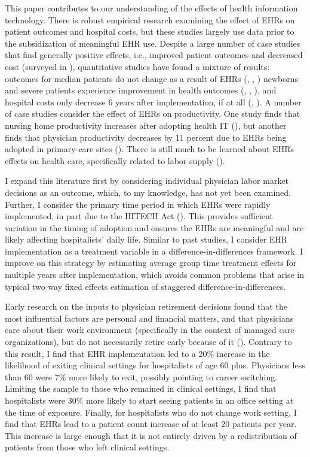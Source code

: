 \documentclass[12pt]{article}
\begin{document}
This paper contributes to our understanding of the effects of health information technology. There is robust empirical research examining the effect of EHRs on patient outcomes and hospital costs, but these studies largely use data prior to the subsidization of meaningful EHR use. Despite a large number of case studies that find generally positive effects, i.e., improved patient outcomes and decreased cost (surveyed in \cite{Buntin2011TheResults}), quantitative studies have found a mixture of results: outcomes for median patients do not change as a result of EHRs (\cite{Agha2014TheCare}, \cite{McCullough2016HealthCoordination}, \cite{Meyerhoefer}) newborns and severe patients experience improvement in health outcomes (\cite{Miller2009}, \cite{Freedman2015}, \cite{McCullough2016HealthCoordination}), and hospital costs only decrease 6 years after implementation, if at all (\cite{Agha2014TheCare}, \cite{dranove2014trillion}). A number of case studies consider the effect of EHRs on productivity. One study finds that nursing home productivity increases after adopting health IT (\cite{Hitt2016}), but another finds that physician productivity decreases by 11 percent due to EHRs being adopted in primary-care sites (\cite{Meyerhoefer}). There is still much to be learned about EHRs effects on health care, specifically related to labor supply (\cite{NBERw29218}). 

I expand this literature first by considering individual physician labor market decisions as an outcome, which, to my knowledge, has not yet been examined. Further, I consider the primary time period in which EHRs were rapidly implemented, in part due to the HITECH Act (\cite{dranove2015investment}). This provides sufficient variation in the timing of adoption and ensures the EHRs are meaningful and are likely affecting hospitalists' daily life. Similar to past studies, I consider EHR implementation as a treatment variable in a difference-in-differences framework. I improve on this strategy by estimating average group time treatment effects for multiple years after implementation, which avoids common problems that arise in typical two way fixed effects estimation of staggered difference-in-differences.  

Early research on the inputs to physician retirement decisions found that the most influential factors are personal and financial matters, and that physicians care about their work environment (specifically in the context of managed care organizations), but do not necessarily retire early because of it (\cite{Bahrami2002}). Contrary to this result, I find that EHR implementation led to a 20\% increase in the likelihood of exiting clinical settings for hospitalists of age 60 plus. Physicians less than 60 were 7\% more likely to exit, possibly pointing to career switching. Limiting the sample to those who remained in clinical settings, I find that hospitalists were 30\% more likely to start seeing patients in an office setting at the time of exposure. Finally, for hospitalists who do not change work setting, I find that EHRs lead to a patient count increase of at least 20 patients per year. This increase is large enough that it is not entirely driven by a redistribution of patients from those who left clinical settings. 
\end{document}

